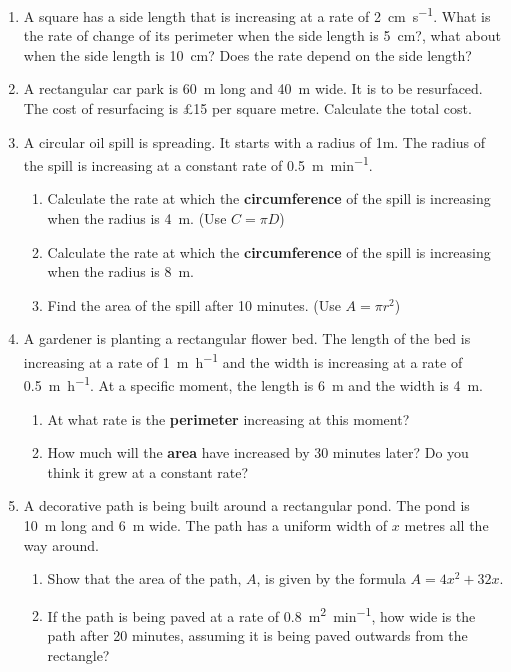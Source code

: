 \documentclass[12pt]{article}
\begin{document}
\begin{enumerate}[resume]

    \item A square has a side length that is increasing at a rate of \SI{2}{\centi\meter\per\second}. What is the rate of change of its perimeter when the side length is \SI{5}{\centi\meter}?, what about when the side length is \SI{10}{\centi\meter}? Does the rate depend on the side length?
\vspace{0.6cm}
    \item A rectangular car park is \SI{60}{\metre} long and \SI{40}{\metre} wide. It is to be resurfaced. The cost of resurfacing is \pounds 15 per square metre. Calculate the total cost.
\vspace{0.6cm}
    \item A circular oil spill is spreading. It starts with a radius of 1m. The radius of the spill is increasing at a constant rate of \SI{0.5}{\metre\per\minute}.
    \begin{enumerate}
        \item Calculate the rate at which the \textbf{circumference} of the spill is increasing when the radius is \SI{4}{\metre}. (Use $C = \pi D$)
        \item Calculate the rate at which the \textbf{circumference} of the spill is increasing when the radius is \SI{8}{\metre}.
        \item Find the area of the spill after 10 minutes.  (Use $A = \pi r^2$)
    \end{enumerate}
\vspace{0.6cm}
    \item A gardener is planting a rectangular flower bed. The length of the bed is increasing at a rate of \SI{1}{\metre\per\hour} and the width is increasing at a rate of \SI{0.5}{\metre\per\hour}. At a specific moment, the length is \SI{6}{\metre} and the width is \SI{4}{\metre}.
    \begin{enumerate}
        \item At what rate is the \textbf{perimeter} increasing at this moment?
        \item How much will the \textbf{area} have increased by 30 minutes later? Do you think it grew at a constant rate?
    \end{enumerate}
\vspace{0.6cm}
    \item A decorative path is being built around a rectangular pond. The pond is \SI{10}{\metre} long and \SI{6}{\metre} wide. The path has a uniform width of $x$ metres all the way around.
    \begin{enumerate}
        \item Show that the area of the path, $A$, is given by the formula $A = 4x^2 + 32x$.
        \item If the path is being paved at a rate of \SI{0.8}{\square\metre\per\minute}, how wide is the path after 20 minutes, assuming it is being paved outwards from the rectangle?
    \end{enumerate}

\end{enumerate}
\end{document}
